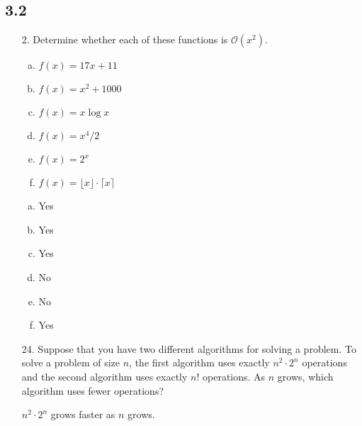 \subsection{3.2}
\begin{itemize}
    \item[2.] Determine whether each of these functions is $\mathcal{O}(x^2)$.
          \begin{enumerate}[a.]
              \item $f(x) = 17x + 11$
              \item $f(x) = x^2 + 1000$
              \item $f(x) = x \log{}x$
              \item $f(x) = x^4 / 2$
              \item $f(x) = 2^x$
              \item $f(x) = \lfloor x \rfloor \cdot \lceil x \rceil$
          \end{enumerate}
          \answer
          \begin{enumerate}[a.]
              \item Yes
              \item Yes
              \item Yes
              \item No
              \item No
              \item Yes
          \end{enumerate}
    \item[24.] Suppose that you have two different algorithms for solving a problem. To solve a problem of size $n$, the first algorithm uses exactly $n^2 \cdot 2^n$ operations and the second algorithm uses exactly $n!$ operations. As $n$ grows, which algorithm uses fewer operations?

          \answer \quad $n^2 \cdot 2^n$ grows faster as $n$ grows.
\end{itemize}

